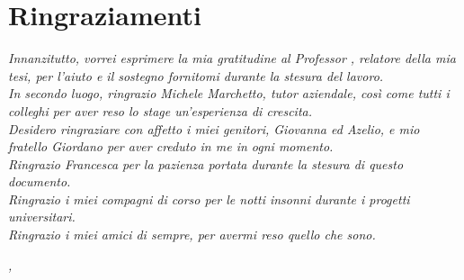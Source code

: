 
{}
{}

\bigskip

\begingroup
\let\clearpage\relax
\let\cleardoublepage\relax
\let\cleardoublepage\relax

\chapter*{Ringraziamenti}

\noindent \textit{Innanzitutto, vorrei esprimere la mia gratitudine al Professor \myProf, relatore della mia tesi, per l'aiuto e il sostegno fornitomi durante la stesura del lavoro.}\\

\noindent \textit{In secondo luogo, ringrazio Michele Marchetto, tutor aziendale, così come tutti i colleghi per aver reso lo stage un'esperienza di crescita.}\\

\noindent \textit{Desidero ringraziare con affetto i miei genitori, Giovanna ed Azelio, e mio fratello Giordano per aver creduto in me in ogni momento.}\\

\noindent \textit{Ringrazio Francesca per la pazienza portata durante la stesura di questo documento.}\\

\noindent \textit{Ringrazio i miei compagni di corso per le notti insonni durante i progetti universitari.}\\

\noindent \textit{Ringrazio i miei amici di sempre, per avermi reso quello che sono.}\\


\bigskip

\noindent\textit{\myLocation, \myTime}
\hfill \myName

\endgroup

